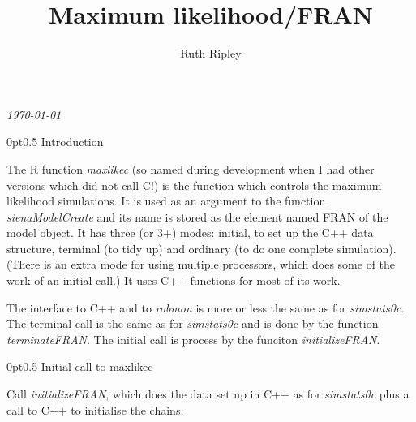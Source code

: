 \documentclass[12pt,a4paper]{article}
\makeatletter
\renewcommand{\=}{\,=\,}
\newcommand{\+}{\,+\,}
\newcommand{\nm}[1]{\textsf{\small #1}}
\newcommand{\nnm}[1]{\textsf{\small\textit{#1}}}
\newcommand{\R}{{\sf R }}
\renewcommand{\section}{\@startsection{section}{1}
                {0pt}{\baselineskip}{0.5\baselineskip}
                {\centering\sffamily} }
\makeatother
\begin{document}
\title{Maximum likelihood/FRAN}
\author{Ruth Ripley}
\date{}
\maketitle

\centerline{\emph{\today}}
\bigskip
\section{Introduction}

The \R function \nnm{maxlikec} (so named during development when I had other
versions which did not call C!) is the function which controls the maximum
likelihood simulations.  It is used as an argument to the function
\nnm{sienaModelCreate} and its name is stored as the element named \nm{FRAN} of
the model object.  It has three (or 3+) modes: initial, to set up the C++ data
structure, terminal (to tidy up) and ordinary (to do one complete
simulation). (There is an extra mode for using multiple processors, which does
some of the work of an initial call.) It uses C++ functions for most of its
work.

The interface to C++ and to \nnm{robmon} is more or less the same as for
\nnm{simstats0c}. The terminal call is the same as for \nnm{simstats0c} and is
done by the function \nnm{terminateFRAN}. The initial call is process by the
funciton \nnm{initializeFRAN}.

\section{Initial call to maxlikec}



 Call \nnm{initializeFRAN}, which does the data set up in C++ as for
\nnm{simstats0c} plus a call to C++ to initialise the
chains.
\end{document}
